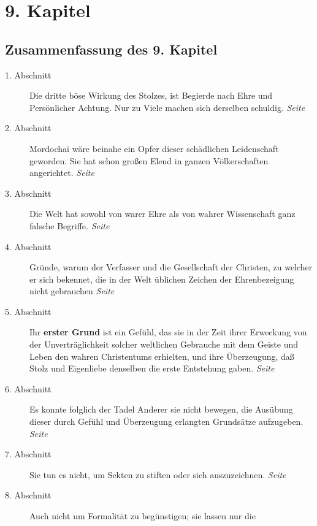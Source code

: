 
\chapter{9. Kapitel} \label{kap9}


\section{Zusammenfassung des 9. Kapitel}

\begin{description}
\item[1. Abschnitt] Die dritte böse Wirkung des Stolzes, ist Begierde nach Ehre
und Persönlicher Achtung. Nur zu Viele machen sich derselben schuldig.
\dotfill \textit{Seite~\pageref{kap9_ab1}}\\
\item[2. Abschnitt] Mordochai wäre beinahe ein Opfer dieser schädlichen
Leidenschaft geworden. Sie hat schon großen Elend in ganzen Völkerschaften
angerichtet.
\dotfill \textit{Seite~\pageref{kap9_ab2}}\\
\item[3. Abschnitt] Die Welt hat sowohl von warer Ehre als von wahrer
Wissenschaft ganz falsche Begriffe.
\dotfill \textit{Seite~\pageref{kap9_ab3}}\\
\item[4. Abschnitt] Gründe, warum der Verfasser und die Gesellschaft der
Christen, zu welcher er sich bekennet, die in der Welt üblichen Zeichen der
Ehrenbezeigung nicht gebrauchen
\dotfill \textit{Seite~\pageref{kap9_ab4}}\\
\item[5. Abschnitt] Ihr \textbf{erster Grund} ist ein Gefühl, das sie in der
Zeit ihrer
Erweckung von der Unverträglichkeit solcher weltlichen Gebrauche mit dem Geiste
und Leben den wahren Christentums erhielten, und ihre Überzeugung, daß Stolz
und Eigenliebe denselben die erste Entstehung gaben.
\dotfill \textit{Seite~\pageref{kap9_ab5}}\\
\item[6. Abschnitt] Es konnte folglich der Tadel Anderer sie nicht bewegen, die
Ausübung dieser durch Gefühl und Überzeugung erlangten Grundsätze aufzugeben.
\dotfill \textit{Seite~\pageref{kap9_ab6}}\\
\item[7. Abschnitt] Sie tun es nicht, um Sekten zu stiften oder sich
auszuzeichnen.
\dotfill \textit{Seite~\pageref{kap9_ab7}}\\
\item[8. Abschnitt] Auch nicht um Formalität zu begünstigen; sie lassen nur die

\end{description}
